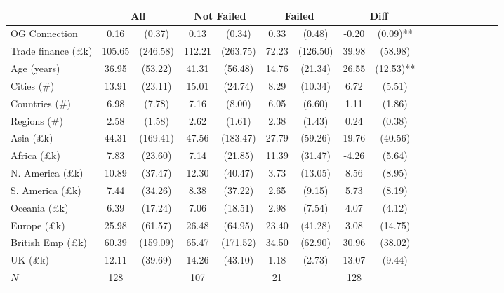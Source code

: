 {
\def\sym#1{\ifmmode^{#1}\else\(^{#1}\)\fi}
\begin{tabular}{l*{4}{cccc}}
\toprule
          &\multicolumn{2}{c}{All}&\multicolumn{2}{c}{Not Failed}&\multicolumn{2}{c}{Failed}&\multicolumn{2}{c}{Diff}\\
\midrule
OG Connection&     0.16&   (0.37)&     0.13&   (0.34)&     0.33&   (0.48)&    -0.20&   (0.09)** \\\hline
Trade finance (\pounds k)&   105.65& (246.58)&   112.21& (263.75)&    72.23& (126.50)&    39.98&  (58.98)   \\
Age (years)&    36.95&  (53.22)&    41.31&  (56.48)&    14.76&  (21.34)&    26.55&  (12.53)** \\
Cities (\#)&    13.91&  (23.11)&    15.01&  (24.74)&     8.29&  (10.34)&     6.72&   (5.51)   \\
Countries (\#)&     6.98&   (7.78)&     7.16&   (8.00)&     6.05&   (6.60)&     1.11&   (1.86)   \\
Regions (\#)&     2.58&   (1.58)&     2.62&   (1.61)&     2.38&   (1.43)&     0.24&   (0.38)   \\
Asia (\pounds k)&    44.31& (169.41)&    47.56& (183.47)&    27.79&  (59.26)&    19.76&  (40.56)   \\
Africa (\pounds k)&     7.83&  (23.60)&     7.14&  (21.85)&    11.39&  (31.47)&    -4.26&   (5.64)   \\
N. America (\pounds k)&    10.89&  (37.47)&    12.30&  (40.47)&     3.73&  (13.05)&     8.56&   (8.95)   \\
S. America (\pounds k)&     7.44&  (34.26)&     8.38&  (37.22)&     2.65&   (9.15)&     5.73&   (8.19)   \\
Oceania (\pounds k)&     6.39&  (17.24)&     7.06&  (18.51)&     2.98&   (7.54)&     4.07&   (4.12)   \\
Europe (\pounds k)&    25.98&  (61.57)&    26.48&  (64.95)&    23.40&  (41.28)&     3.08&  (14.75)   \\
British Emp (\pounds k)&    60.39& (159.09)&    65.47& (171.52)&    34.50&  (62.90)&    30.96&  (38.02)   \\
UK (\pounds k)&    12.11&  (39.69)&    14.26&  (43.10)&     1.18&   (2.73)&    13.07&   (9.44)   \\
\midrule
\(N\)     &      128&         &      107&         &       21&         &      128&            \\
\bottomrule
\end{tabular}
}

